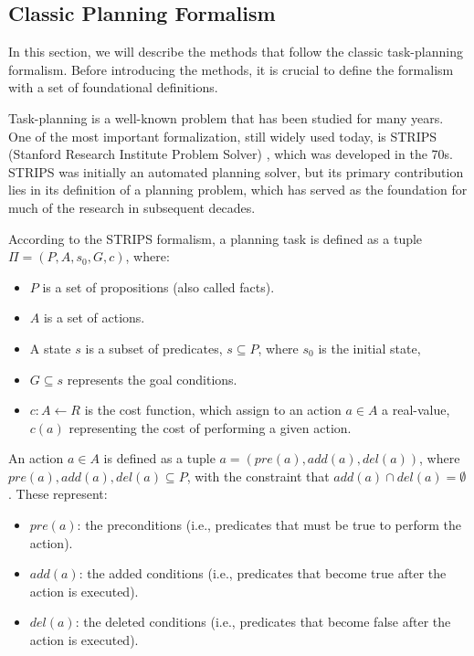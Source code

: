 \subsection{Classic Planning Formalism}
\label{sec:pddl_formalism}
In this section, we will describe the methods that follow the classic task-planning formalism. Before introducing the methods, it is crucial to define the formalism with a set of foundational definitions.

Task-planning is a well-known problem that has been studied for many years. One of the most important formalization, still widely used today, is STRIPS (Stanford Research Institute Problem Solver) \cite{fikes1971strips}, which was developed in the 70s. STRIPS was initially an automated planning solver, but its primary contribution lies in its definition of a planning problem, which has served as the foundation for much of the research in subsequent decades.

According to the STRIPS formalism, a planning task is defined as a tuple $\Pi = (P, A, s_0, G, c)$, where:
\begin{itemize}
    \item $P$ is a set of propositions (also called facts).
    \item $A$ is a set of actions.
    \item A state $s$ is a subset of predicates, $s \subseteq P$, where $s_0$ is the initial state,
    \item $G \subseteq s$ represents the goal conditions.
    \item $c: A \leftarrow R$ is the cost function, which assign to an action $a \in A$ a real-value, $c(a)$ representing the cost of performing a given action.
\end{itemize}

An action $a \in A$ is defined as a tuple $a = \left(pre(a), add(a), del(a)\right)$, where $pre(a), add(a), del(a) \subseteq P$, with the constraint that $add(a) \cap del(a) = \emptyset$. 
\newline These represent:
\begin{itemize}
    \item $pre(a)$: the preconditions (i.e., predicates that must be true to perform the action).
    \item $add(a)$: the added conditions (i.e., predicates that become true after the action is executed).
    \item $del(a)$: the deleted conditions (i.e., predicates that become false after the action is executed).
\end{itemize}

